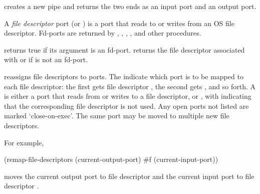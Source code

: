 
%


\begin{protos}
\end{protos}
\noindent
{} creates a new pipe and returns the two ends as an
 input port and an output port.


A {\em file descriptor} port (or )
 is a port that reads to or writes from an OS file descriptor.
Fd-ports are returned by , ,
 , , and other procedures.

\begin{protos}
\end{protos}
\noindent
{} returns true if its argument is an fd-port.
 returns the file descriptor associated with
 or  if  is not an fd-port.

\begin{protos}
\end{protos}
\noindent
{} reassigns file descriptors to ports.
The  indicate which port is to be mapped to each
 file descriptor: the first gets file descriptor , the second gets
 , and so forth.
A  is either a port that reads from or writes to
 a file descriptor,
 or , with  indicating that the corresponding file
 descriptor is not used.
Any open ports not listed are marked `close-on-exec'.
The same port may be moved to multiple new file descriptors.

For example,
\begin{example}
(remap-file-descriptors (current-output-port)
                        \#f
                        (current-input-port))
\end{example}
moves the current output port to file descriptor  and the
current input port to file descriptor .

